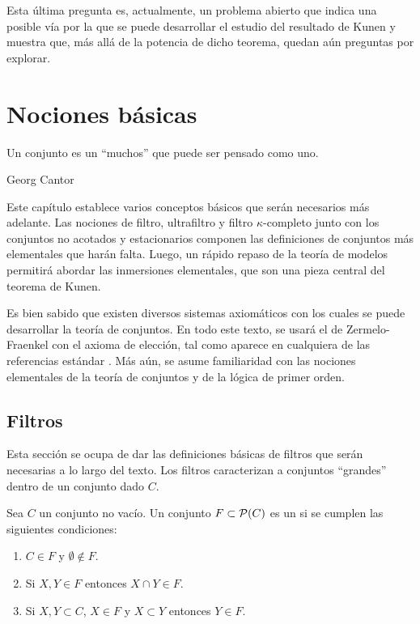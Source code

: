 \documentclass
[
  12pt,
  letterpaper,
  openany,
  oneside,
]{book}
\begin{document}
Esta última pregunta es, actualmente, un problema abierto
que indica una posible vía por la que se puede desarrollar
el estudio del resultado de Kunen y muestra que, más allá
de la potencia de dicho teorema, quedan aún preguntas por explorar.

\fi
\ifbasicos
\chapter{Nociones básicas}
\thispagestyle{empty}

\epigraph
{
    Un conjunto es un “muchos” que puede ser pensado como uno.
}
{Georg Cantor \autocite[3]{ivorra_teoria_2022}}

Este capítulo establece varios conceptos básicos que serán necesarios
más adelante. Las nociones de filtro, ultrafiltro y filtro $\kappa$-completo
junto con los conjuntos no acotados y estacionarios componen las definiciones de
conjuntos más elementales que harán falta.
Luego, un rápido repaso de la teoría de modelos permitirá abordar las inmersiones
elementales, que son una pieza central del teorema de Kunen.

Es bien sabido que existen diversos sistemas axiomáticos
con los cuales se puede desarrollar la teoría de conjuntos.
En todo este texto, se usará el de Zermelo-Fraenkel con el axioma de elección, tal como
aparece en cualquiera de las referencias estándar \autocite{kunen_set_2013,jech_set_2003}.
Más aún, se asume familiaridad con las nociones elementales de la teoría de conjuntos
y de la lógica de primer orden.

\section{Filtros}

Esta sección se ocupa de dar las definiciones básicas de filtros
que serán necesarias a lo largo del texto.
Los filtros caracterizan a conjuntos ``grandes'' dentro
de un conjunto dado $C$.

\begin{defi}
    Sea $C$ un conjunto no vacío. Un conjunto $F\subset \pwset{C}$ es un
     si se cumplen las siguientes condiciones:
    \begin{enumerate}[label=(\roman*)]
        \item $C\in F$ y $\emptyset\notin F$.
        \item Si $X,Y\in F$ entonces $X\cap Y\in F$.
        \item Si $X,Y\subset C$, $X\in F$ y $X\subset Y$ entonces $Y\in F$.
    \end{enumerate}
\end{defi}
\end{document}
